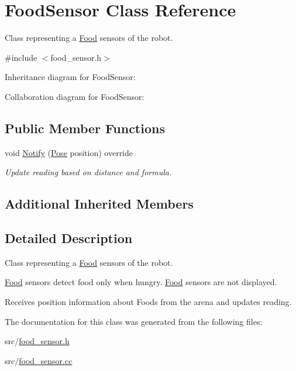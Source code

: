\hypertarget{classFoodSensor}{}\section{Food\+Sensor Class Reference}
\label{classFoodSensor}


Class representing a \hyperlink{classFood}{Food} sensors of the robot.  




{\ttfamily \#include $<$food\+\_\+sensor.\+h$>$}



Inheritance diagram for Food\+Sensor\+:


Collaboration diagram for Food\+Sensor\+:
\subsection*{Public Member Functions}
\begin{DoxyCompactItemize}
\item 
void \hyperlink{classFoodSensor_a05594d17597e57efe9dd52aa7b683ae0}{Notify} (\hyperlink{structPose}{Pose} position) override\hypertarget{classFoodSensor_a05594d17597e57efe9dd52aa7b683ae0}{}\label{classFoodSensor_a05594d17597e57efe9dd52aa7b683ae0}

\begin{DoxyCompactList}\small\item\em Update reading based on distance and formula. \end{DoxyCompactList}\end{DoxyCompactItemize}
\subsection*{Additional Inherited Members}


\subsection{Detailed Description}
Class representing a \hyperlink{classFood}{Food} sensors of the robot. 

\hyperlink{classFood}{Food} sensors detect food only when hungry. \hyperlink{classFood}{Food} sensors are not displayed.

Receives position information about Foods from the arena and updates reading. 

The documentation for this class was generated from the following files\+:\begin{DoxyCompactItemize}
\item 
src/\hyperlink{food__sensor_8h}{food\+\_\+sensor.\+h}\item 
src/\hyperlink{food__sensor_8cc}{food\+\_\+sensor.\+cc}\end{DoxyCompactItemize}
